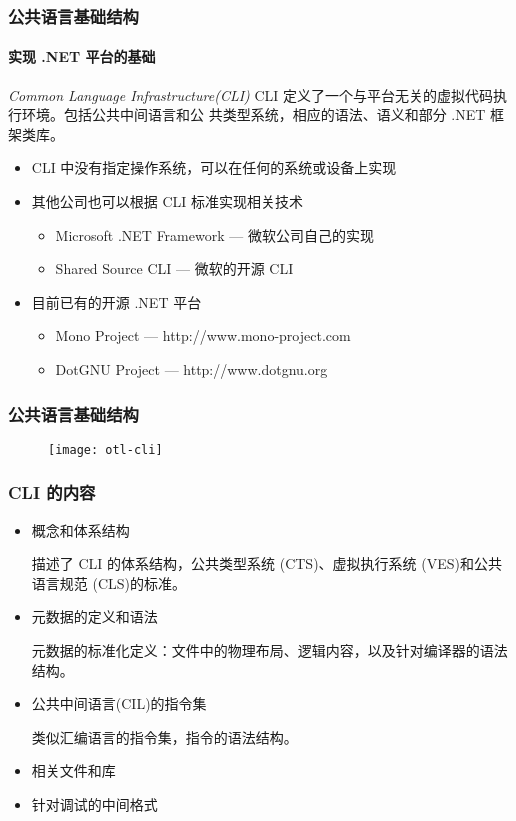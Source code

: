 \begin{frame}
\frametitle{公共语言基础结构}
\framesubtitle{实现 .NET 平台的基础}
\begin{block}{\textit{Common Language Infrastructure(CLI)}}
  \CJKindent CLI 定义了一个与平台无关的虚拟代码执行环境。包括公共中间语言和公
  共类型系统，相应的语法、语义和部分 .NET 框架类库。
\end{block}
\begin{itemize}
\item<2-| handout:1> CLI 中没有指定操作系统，可以在任何的系统或设备上实现
\item<3-| handout:1> 其他公司也可以根据 CLI 标准实现相关技术
  \begin{itemize}
  \item Microsoft .NET Framework --- 微软公司自己的实现
  \item Shared Source CLI --- 微软的开源 CLI
  \end{itemize}
\item<4-| handout:1> 目前已有的开源 .NET 平台
  \begin{itemize}
  \item Mono Project --- http://www.mono-project.com
  \item DotGNU Project --- http://www.dotgnu.org
  \end{itemize}
\end{itemize}
\end{frame}


\begin{frame}
\frametitle{公共语言基础结构}
\begin{figure}
\centering \texttt{[image: otl-cli]}
\end{figure}
\end{frame}

\begin{frame}
\frametitle{CLI 的内容}

\begin{itemize}
\CJKindent
\item 概念和体系结构

  描述了 CLI 的体系结构，公共类型系统 (CTS)、虚拟执行系统 (VES)和公共语言规范 (CLS)的标准。

\item 元数据的定义和语法

  元数据的标准化定义：文件中的物理布局、逻辑内容，以及针对编译器的语法结构。

\item 公共中间语言(CIL)的指令集

  类似汇编语言的指令集，指令的语法结构。

\item 相关文件和库
\item 针对调试的中间格式

\end{itemize}

\end{frame}

